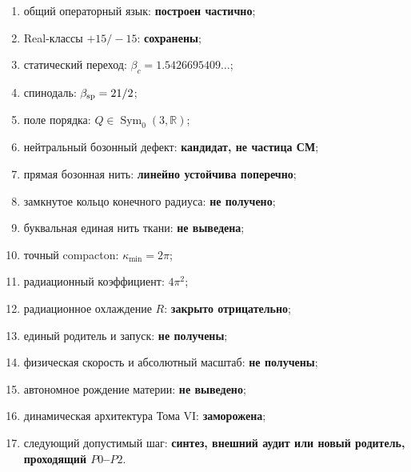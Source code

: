 \begin{protocol}
\begin{enumerate}
 \item общий операторный язык: \textbf{построен частично};
 \item Real-классы $+15/-15$: \textbf{сохранены};
 \item статический переход: \textbf{$\beta_c=1.5426695409\ldots$};
 \item спинодаль: \textbf{$\beta_{\rm sp}=21/2$};
 \item поле порядка: \textbf{$Q\in\operatorname{Sym}_0(3,\mathbb R)$};
 \item нейтральный бозонный дефект: \textbf{кандидат, не частица СМ};
 \item прямая бозонная нить: \textbf{линейно устойчива поперечно};
 \item замкнутое кольцо конечного радиуса: \textbf{не получено};
 \item буквальная единая нить ткани: \textbf{не выведена};
 \item точный compacton: \textbf{$\kappa_{\min}=2\pi$};
 \item радиационный коэффициент: \textbf{$4\pi^2$};
 \item радиационное охлаждение $R$: \textbf{закрыто отрицательно};
 \item единый родитель и запуск: \textbf{не получены};
 \item физическая скорость и абсолютный масштаб: \textbf{не получены};
 \item автономное рождение материи: \textbf{не выведено};
 \item динамическая архитектура Тома VI: \textbf{заморожена};
 \item следующий допустимый шаг: \textbf{синтез, внешний аудит или новый
 родитель, проходящий $P0$--$P2$}.
\end{enumerate}
\end{protocol}